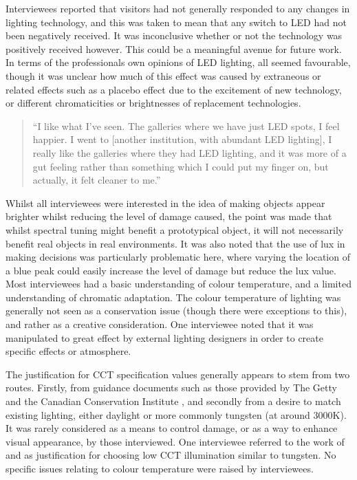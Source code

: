 Interviewees reported that visitors had not generally responded to any changes in lighting technology, and this was taken to mean that any switch to \gls{LED} had not been negatively received. It was inconclusive whether or not the technology was positively received however. This could be a meaningful avenue for future work. In terms of the professionals own opinions of \gls{LED} lighting, all seemed favourable, though it was unclear how much of this effect was caused by extraneous or related effects such as a placebo effect due to the excitement of new technology, or different chromaticities or brightnesses of replacement technologies.  

\begin{quote}
``I like what I've seen. The galleries where we have just \gls{LED} spots, I feel happier. I went to [another institution, with abundant \gls{LED} lighting], I really like the galleries where they had \gls{LED} lighting, and it was more of a gut feeling rather than something which I could put my finger on, but actually, it felt cleaner to me.''
\end{quote}

Whilst all interviewees were interested in the idea of making objects appear brighter whilst reducing the level of damage caused, the point was made that whilst spectral tuning might benefit a prototypical object, it will not necessarily benefit real objects in real environments. It was also noted that the use of lux in making decisions was particularly problematic here, where varying the location of a blue peak could easily increase the level of damage but reduce the lux value.
Most interviewees had a basic understanding of colour temperature, and a limited understanding of chromatic adaptation. The colour temperature of lighting was generally not seen as a conservation issue (though there were exceptions to this), and rather as a creative consideration. One interviewee noted that it was manipulated to great effect by external lighting designers in order to create specific effects or atmosphere.

The justification for \gls{CCT} specification values generally appears to stem from two routes. Firstly, from guidance documents such as those provided by The Getty and the Canadian Conservation Institute \citep{druzik_guidelines_2012}, and secondly from a desire to match existing lighting, either daylight or more commonly tungsten (at around 3000K). It was rarely considered as a means to control damage, or as a way to enhance visual appearance, by those interviewed. One interviewee referred to the work of \citet{kruithof_tubular_1941} and \citet{scuello_museum_2004,scuello_museum_2004-1} as justification for choosing low \gls{CCT} illumination similar to tungsten. No specific issues relating to colour temperature were raised by interviewees.

